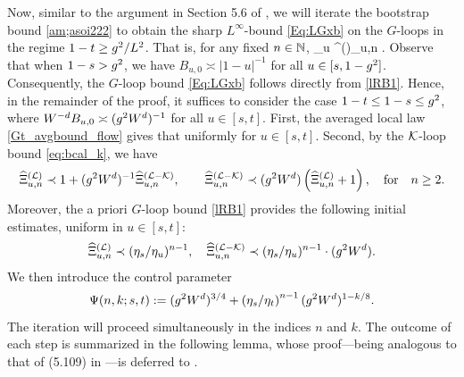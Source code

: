 

Now, similar to the argument in Section 5.6 of \cite{YY_25}, we will iterate the bootstrap bound \eqref{am;asoi222} to obtain the sharp $L^\infty$-bound \eqref{Eq:LGxb} on the $G$-loops in the regime $1-t\ge g^2/L^{2}$. That is, for any fixed $n\in \mathbb{N}$, 
\be\label{eq:Xiiter}
\sup_{u\in [s,t]} \wh\Xi^{(\cL)}_{u,n} .
\ee
Observe that when $1-s>g^2$, we have \(B_{u,0}\asymp |1-u|^{-1}\) for all $u\in [s,1-g^2]$. Consequently, the $G$-loop bound \eqref{Eq:LGxb} follows directly from \eqref{lRB1}. 
Hence, in the remainder of the proof, it suffices to consider the case $1-t\le 1-s \le g^2$, where \(W^{-d}B_{u,0}\asymp (g^2W^d)^{-1}\) for all \(u\in [s,t].\) %
First, the averaged local law \eqref{Gt_avgbound_flow} gives that  uniformly for $u\in[s,t]$. Second, by the $\mathcal K$-loop bound \eqref{eq:bcal_k}, we have %
\begin{align}\label{rela_XILXILK}
    \widehat\Xi^{(\mathcal L)}_{u,n}\prec 1+(g^2W^{d})^{-1} \widehat\Xi^{({\mathcal L-\mathcal K})}_{u, n},\quad \quad \widehat\Xi^{({\mathcal L-\mathcal K})}_{u, n}\prec  (g^2W^{d})\left(\widehat\Xi^{(\mathcal L)}_{u,n}+1\right),\quad \text{for}\quad n\ge 2 .
\end{align}
Moreover, the a priori $G$-loop bound \eqref{lRB1} provides the following initial estimates, uniform in $u\in[s,t]$:
\begin{align}\label{sef8w483r324}
  \widehat\Xi^{(\mathcal L)}_{u,n}\prec (\eta_s/\eta_u)^{n-1}, \quad 
 \widehat\Xi^{({\mathcal L-\mathcal K})}_{u, n}\prec (\eta_s/\eta_u)^{n-1}\cdot (g^2W^{d}).
\end{align}
We then introduce the control parameter
\begin{equation}\label{adsyzz0s8d6}
\Psi(n,k;s,t):= (g^2W^{d})^{3/4} +\left({{\eta_s}/{\eta_t}}\right)^{n-1}(g^2W^{d})^{1-k/8}.
\end{equation} 
The iteration will proceed simultaneously in the indices $n$ and $k$. The outcome of each step is summarized in the following lemma, whose proof---being analogous to that of (5.109) in \cite{YY_25}---is deferred to .

